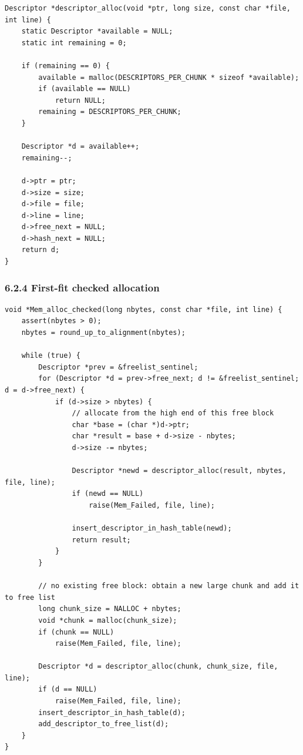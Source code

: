 \documentclass[11pt]{article}
\begin{document}
\begin{verbatim}
Descriptor *descriptor_alloc(void *ptr, long size, const char *file, int line) {
    static Descriptor *available = NULL;
    static int remaining = 0;

    if (remaining == 0) {
        available = malloc(DESCRIPTORS_PER_CHUNK * sizeof *available);
        if (available == NULL)
            return NULL;
        remaining = DESCRIPTORS_PER_CHUNK;
    }

    Descriptor *d = available++;
    remaining--;

    d->ptr = ptr;
    d->size = size;
    d->file = file;
    d->line = line;
    d->free_next = NULL;
    d->hash_next = NULL;
    return d;
}
\end{verbatim}

\subsubsection{6.2.4 First-fit checked allocation}\label{first-fit-checked-allocation}

\begin{verbatim}
void *Mem_alloc_checked(long nbytes, const char *file, int line) {
    assert(nbytes > 0);
    nbytes = round_up_to_alignment(nbytes);

    while (true) {
        Descriptor *prev = &freelist_sentinel;
        for (Descriptor *d = prev->free_next; d != &freelist_sentinel; d = d->free_next) {
            if (d->size > nbytes) {
                // allocate from the high end of this free block
                char *base = (char *)d->ptr;
                char *result = base + d->size - nbytes;
                d->size -= nbytes;

                Descriptor *newd = descriptor_alloc(result, nbytes, file, line);
                if (newd == NULL)
                    raise(Mem_Failed, file, line);

                insert_descriptor_in_hash_table(newd);
                return result;
            }
        }

        // no existing free block: obtain a new large chunk and add it to free list
        long chunk_size = NALLOC + nbytes;
        void *chunk = malloc(chunk_size);
        if (chunk == NULL)
            raise(Mem_Failed, file, line);

        Descriptor *d = descriptor_alloc(chunk, chunk_size, file, line);
        if (d == NULL)
            raise(Mem_Failed, file, line);
        insert_descriptor_in_hash_table(d);
        add_descriptor_to_free_list(d);
    }
}
\end{verbatim}
\end{document}
